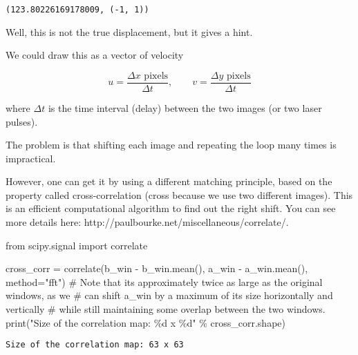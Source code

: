 \documentclass[
  english,
  letterpaper,
  numbers=noendperiod,
  DIV=13]{scrreprt}
\newenvironment{Shaded}{\begin{snugshade}}{\end{snugshade}}
\newcommand{\BuiltInTok}[1]{\textcolor[rgb]{0.00,0.23,0.31}{#1}}
\newcommand{\CommentTok}[1]{\textcolor[rgb]{0.37,0.37,0.37}{#1}}
\newcommand{\ImportTok}[1]{\textcolor[rgb]{0.00,0.46,0.62}{#1}}
\newcommand{\NormalTok}[1]{\textcolor[rgb]{0.00,0.23,0.31}{#1}}
\newcommand{\OperatorTok}[1]{\textcolor[rgb]{0.37,0.37,0.37}{#1}}
\newcommand{\SpecialCharTok}[1]{\textcolor[rgb]{0.37,0.37,0.37}{#1}}
\newcommand{\StringTok}[1]{\textcolor[rgb]{0.13,0.47,0.30}{#1}}
\begin{document}
\begin{verbatim}
(123.80226169178009, (-1, 1))
\end{verbatim}

Well, this is not the true displacement, but it gives a hint.

We could draw this as a vector of velocity

\[
    u = \frac{\Delta x \text{ pixels}}{\Delta t} ,\qquad v = \frac{\Delta y \text{ pixels}}{\Delta t}
\]

where \(\Delta t\) is the time interval (delay) between the two images
(or two laser pulses).

The problem is that shifting each image and repeating the loop many
times is impractical.

However, one can get it by using a different matching principle, based
on the property called cross-correlation (cross because we use two
different images). This is an efficient computational algorithm to find
out the right shift. You can see more details here:
http://paulbourke.net/miscellaneous/correlate/.

\begin{Shaded}
\begin{Highlighting}[]
\ImportTok{from}\NormalTok{ scipy.signal }\ImportTok{import}\NormalTok{ correlate}

\NormalTok{cross\_corr }\OperatorTok{=}\NormalTok{ correlate(b\_win }\OperatorTok{{-}}\NormalTok{ b\_win.mean(), a\_win }\OperatorTok{{-}}\NormalTok{ a\_win.mean(), method}\OperatorTok{=}\StringTok{"fft"}\NormalTok{)}
\CommentTok{\# Note that it\textquotesingle{}s approximately twice as large as the original windows, as we}
\CommentTok{\# can shift a\_win by a maximum of its size horizontally and vertically}
\CommentTok{\# while still maintaining some overlap between the two windows.}
\BuiltInTok{print}\NormalTok{(}\StringTok{"Size of the correlation map: }\SpecialCharTok{\%d}\StringTok{ x }\SpecialCharTok{\%d}\StringTok{"} \OperatorTok{\%}\NormalTok{ cross\_corr.shape)}
\end{Highlighting}
\end{Shaded}

\begin{verbatim}
Size of the correlation map: 63 x 63
\end{verbatim}
\end{document}
